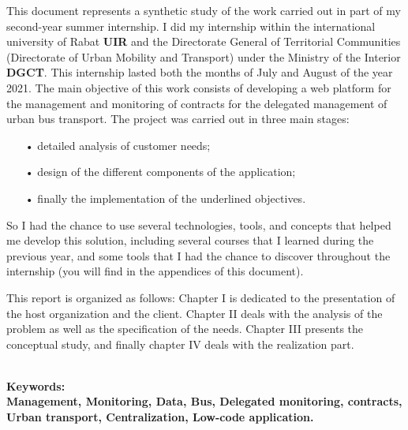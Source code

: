 This document represents a synthetic study of the work carried out in part of my second-year summer internship. I did my internship within
the international university of Rabat \textbf{UIR} and the Directorate General of Territorial Communities (Directorate of Urban Mobility and Transport) under the Ministry of the Interior \textbf{DGCT}. This internship lasted both
the months of July and August of the year 2021. The main objective of this work
consists of developing a web platform for the management and monitoring of
contracts for the delegated management of urban bus transport. The project was carried out in three main stages:
\begin{itemize}
    \item[•] detailed analysis of customer needs;
    \item[•] design of the different components of the application;
    \item[•] finally the implementation of the underlined objectives.
\end{itemize}
So I had the chance to use several technologies, tools, and concepts that helped me develop this solution, including several courses that I learned during the previous year, and some tools that I had the chance to discover throughout the internship (you will find in the appendices of this document).

This report is organized as follows: Chapter I is dedicated to
the presentation of
the host organization and the client. Chapter II deals with
the analysis of the problem as well as the specification of the needs.
Chapter III presents the conceptual study, and finally chapter IV deals with the
realization part.

\textbf{\\Keywords:\\Management, Monitoring, Data, Bus, Delegated monitoring, contracts, Urban transport, Centralization, Low-code application.}
